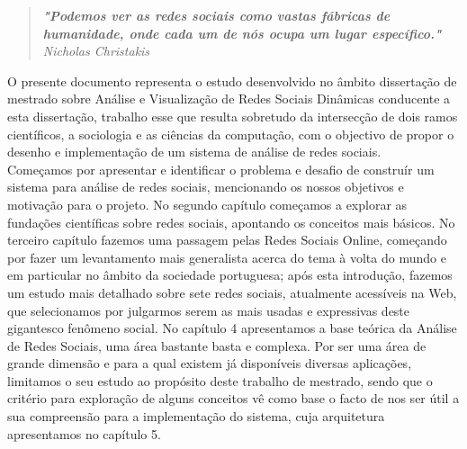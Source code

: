 
\begin{quote}
\textit{\textbf{"Podemos ver as redes sociais como vastas fábricas de humanidade, onde cada um de nós ocupa um lugar específico."} Nicholas Christakis}
\end{quote}

O presente documento representa o estudo desenvolvido no âmbito dissertação de mestrado sobre Análise e Visualização de Redes Sociais Dinâmicas conducente a esta dissertação, trabalho esse que resulta sobretudo da intersecção de dois ramos científicos, a sociologia e as ciências da computação, com o objectivo de propor o desenho e implementação de um sistema de análise de redes sociais.\\

\indent Começamos por apresentar e identificar o problema e desafio de construír um sistema para análise de redes sociais, mencionando os nossos objetivos e motivação para o projeto. No segundo capítulo começamos a explorar as fundações científicas sobre redes sociais, apontando os conceitos mais básicos. No terceiro capítulo fazemos uma passagem pelas Redes Sociais Online, começando por fazer um levantamento mais generalista acerca do tema à volta do mundo e em particular no âmbito da sociedade portuguesa; após esta introdução, fazemos um estudo mais detalhado sobre sete redes sociais, atualmente acessíveis na Web, que selecionamos por julgarmos serem as mais usadas e expressivas deste gigantesco fenômeno social. No capítulo 4 apresentamos a base teórica  da Análise de Redes Sociais, uma área bastante basta e complexa. Por ser uma área de grande dimensão e para a qual existem já disponíveis diversas aplicações, limitamos o seu estudo ao propósito deste trabalho de mestrado, sendo que o critério para exploração de alguns conceitos vê como base o facto de nos ser útil a sua compreensão para a implementação do sistema, cuja arquitetura apresentamos no capítulo 5.\\

